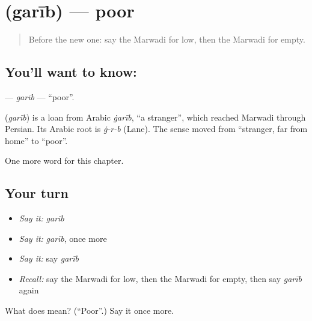 \section[\texorpdfstring{\mw{गरीब} (garīb)}{गरीब (garīb)}]{ (garīb) — poor}

\label{lesson:MW-C75-garib}



\begin{quote}
Before the new one: say the Marwadi for low, then the Marwadi for empty.
\end{quote}

\subsection*{You'll want to know: }
\textbf{} — \emph{garīb} — \textquotedblleft{}poor\textquotedblright{}.

\begin{cousinweb}
\textbf{} (\emph{garīb}) is a loan from Arabic \emph{ġarīb}, \textquotedblleft{}a stranger\textquotedblright{}, which reached Marwadi through Persian. Its Arabic root is \emph{ġ-r-b} (Lane). The sense moved from \textquotedblleft{}stranger, far from home\textquotedblright{} to \textquotedblleft{}poor\textquotedblright{}.
\end{cousinweb}

\begin{grammarlens}[title={What you've built}]
One more word for this chapter.
\end{grammarlens}

\subsection*{Your turn}
\begin{itemize}
\raggedright
  \item \emph{Say it:} \emph{garīb}
  \item \emph{Say it:} \emph{garīb}, once more
  \item \emph{Say it:} say \emph{garīb}
  \item \emph{Recall:} say the Marwadi for low, then the Marwadi for empty, then say \emph{garīb} again
\end{itemize}

\begin{tcolorbox}[breakable,colback=teal!4,colframe=teal!35!black,title={Before you move on}]
What does  mean? (\textquotedblleft{}Poor\textquotedblright{}.) Say it once more.
\end{tcolorbox}
